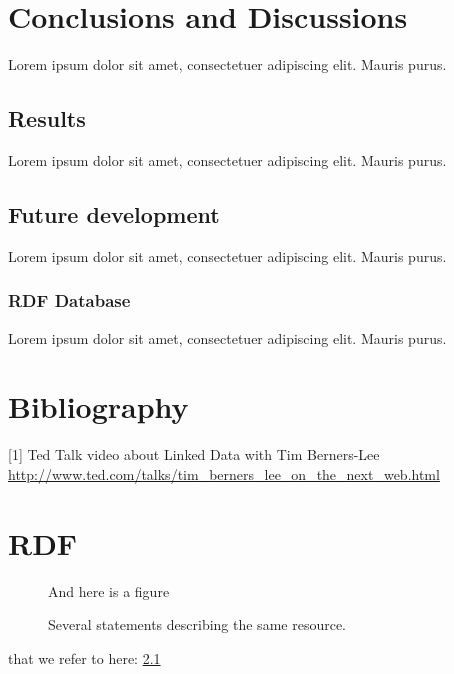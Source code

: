 \documentclass[a4paper,11pt]{kth-mag}
\begin{document}
\chapter{Conclusions and Discussions}

Lorem ipsum dolor sit amet, consectetuer adipiscing elit. Mauris
purus. 

\section{Results}

Lorem ipsum dolor sit amet, consectetuer adipiscing elit. Mauris
purus. 

\section{Future development}

Lorem ipsum dolor sit amet, consectetuer adipiscing elit. Mauris
purus. 

\subsection{RDF Database}

Lorem ipsum dolor sit amet, consectetuer adipiscing elit. Mauris
purus. 

\chapter*{Bibliography}

[1] Ted Talk video about Linked Data with Tim Berners-Lee \url{http://www.ted.com/talks/tim_berners_lee_on_the_next_web.html}


\appendix
\addappheadtotoc
\chapter{RDF}\label{appA}

\begin{figure}[ht]
\begin{center}
And here is a figure
\caption{\small{Several statements describing the same resource.}}\label{RDF_4}
\end{center}
\end{figure}

that we refer to here: \ref{RDF_4}
\end{document}
